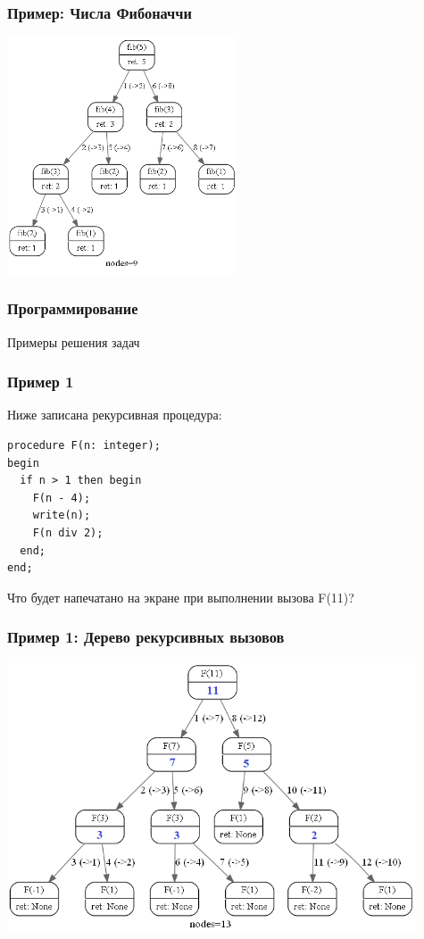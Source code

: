 \begin{frame}
\frametitle{Пример: Числа Фибоначчи}
\setlength{\columnsep}{-7cm}
\begin{multicols}{2}




\columnbreak

\includegraphics[height=7cm, right]{images/fib.png}

\end{multicols}

\end{frame}


\begin{frame}
\frametitle{Программирование}

\begin{center}

\Huge
Примеры решения задач
\end{center}
\end{frame}

\begin{frame}[fragile]
\frametitle{Пример 1}

Ниже записана рекурсивная процедура:
\begin{lstlisting}[style=CStyle]
procedure F(n: integer);
begin
  if n > 1 then begin
    F(n - 4);
    write(n);
    F(n div 2);
  end;
end;
\end{lstlisting}
Что будет напечатано на экране при выполнении вызова F(11)?

\end{frame}

\begin{frame}[fragile]
\frametitle{Пример 1: Дерево рекурсивных вызовов}

\includegraphics[height=8cm, center]{images/rec01.png}
\end{frame}


